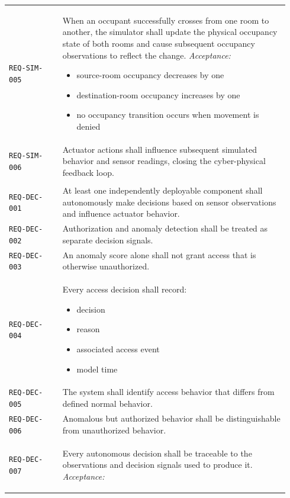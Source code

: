 \documentclass[11pt]{article}
\providecommand{\tightlist}{\setlength{\itemsep}{0pt}\setlength{\parskip}{0pt}}
\begin{document}
\begin{longtable}[]{@{}
>{\raggedright\arraybackslash}p{0.18\linewidth}
>{\raggedright\arraybackslash}p{0.76\linewidth}@{}}
\addlinespace[3pt]
\texttt{REQ-SIM-005} & When an occupant successfully crosses from one room to another, the simulator shall update the physical occupancy state of both rooms and cause subsequent occupancy observations to reflect the change.
\textit{Acceptance:}
\begin{itemize}\tightlist
\item source-room occupancy decreases by one
\item destination-room occupancy increases by one
\item no occupancy transition occurs when movement is denied
\end{itemize} \\
\addlinespace[3pt]
\texttt{REQ-SIM-006} & Actuator actions shall influence subsequent simulated behavior and sensor readings, closing the cyber-physical feedback loop. \\
\addlinespace[3pt]
\multicolumn{2}{@{}l}{\textbf{Autonomous decision requirements}} \\[2pt]
\texttt{REQ-DEC-001} & At least one independently deployable component shall autonomously make decisions based on sensor observations and influence actuator behavior. \\
\addlinespace[3pt]
\texttt{REQ-DEC-002} & Authorization and anomaly detection shall be treated as separate decision signals. \\
\addlinespace[3pt]
\texttt{REQ-DEC-003} & An anomaly score alone shall not grant access that is otherwise unauthorized. \\
\addlinespace[3pt]
\texttt{REQ-DEC-004} & Every access decision shall record:
\begin{itemize}\tightlist
\item decision
\item reason
\item associated access event
\item model time
\end{itemize} \\
\addlinespace[3pt]
\texttt{REQ-DEC-005} & The system shall identify access behavior that differs from defined normal behavior. \\
\addlinespace[3pt]
\texttt{REQ-DEC-006} & Anomalous but authorized behavior shall be distinguishable from unauthorized behavior. \\
\addlinespace[3pt]
\texttt{REQ-DEC-007} & Every autonomous decision shall be traceable to the observations and decision signals used to produce it.
\textit{Acceptance:}
\begin{itemize}\tightlist

\end{itemize}
\end{longtable}
\end{document}
